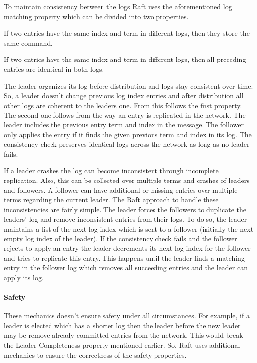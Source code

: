 To maintain consistency between the logs Raft uses the aforementioned
log matching property which can be divided into two properties.

\begin{defi}
  If two entries have the same index and term in different logs, then
  they store the same command.
\end{defi}

\begin{defi}
  If two entries have the same index and term in different logs, then
  all preceding entries are identical in both logs.
\end{defi}

The leader organizes its log before distribution and logs stay
consistent over time. So, a leader doesn't change previous log index
entries and after distribution all other logs are coherent to the leaders
one. From this follows the first property. The second one follows
from the way an entry is replicated in the network. The leader
includes the previous entry term and index in the message. The follower only
applies the entry if it finds the given previous term and index in its
log. The consistency check preserves identical logs across the
network as long as no leader fails.~\cite{ongaro2014search}

If a leader crashes the log can become inconsistent through incomplete
replication. Also, this can be collected over multiple terms and
crashes of leaders and followers. A follower can have additional
or missing entries over multiple terms regarding the current leader.
The Raft approach to handle these inconsistencies are fairly simple.
The leader forces the followers to duplicate the leaders' log and
remove inconsistent entries from their logs. 
To do so, the leader maintains a list of the next log index
which is sent to a follower (initially the next empty log index of the leader). 
If the consistency check fails and the follower rejects to apply
an entry the leader decrements its next log index for the follower
and tries to replicate this entry. This happens until the leader
finds a matching entry in the follower log which removes all
succeeding entries and the leader can apply its log.~\cite{ongaro2014search}

\paragraph{Safety}
These mechanics doesn't ensure safety under all circumstances.
For example, if a leader is elected which has a shorter log
then the leader before the new leader may be remove already
committed entries from the network. This would break the
Leader Completeness property mentioned earlier. So, Raft
uses additional mechanics to ensure the correctness of
the safety properties.~\cite{ongaro2014search}

